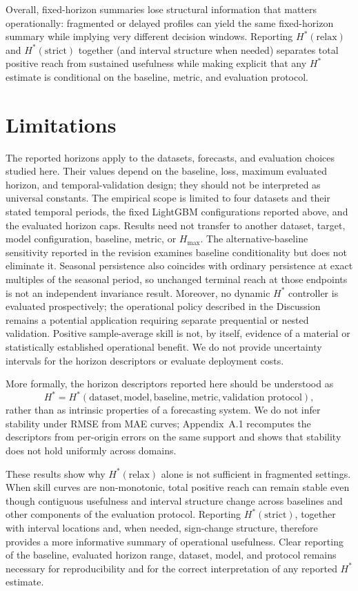 \documentclass[pdflatex]{sn-jnl}
\begin{document}
Overall, fixed-horizon summaries lose structural information that matters operationally: fragmented or delayed profiles can yield the same fixed-horizon summary while implying very different decision windows. Reporting $H^*(\mathrm{relax})$ and $H^*(\mathrm{strict})$ together (and interval structure when needed) separates total positive reach from sustained usefulness while making explicit that any $H^*$ estimate is conditional on the baseline, metric, and evaluation protocol.

\section{Limitations}

The reported horizons apply to the datasets, forecasts, and evaluation
choices studied here. Their values depend on the baseline, loss,
maximum evaluated horizon, and temporal-validation design; they should
not be interpreted as universal constants.
The empirical scope is limited to four datasets and their stated temporal
periods, the fixed LightGBM configurations reported above, and the evaluated
horizon caps. Results need not transfer to another dataset, target, model
configuration, baseline, metric, or $H_{\max}$. The alternative-baseline
sensitivity reported in the revision examines baseline conditionality but
does not eliminate it. Seasonal persistence also coincides with ordinary
persistence at exact multiples of the seasonal period, so unchanged terminal
reach at those endpoints is not an independent invariance result. Moreover, no dynamic $H^*$ controller is evaluated
prospectively; the operational policy described in the Discussion remains a
potential application requiring separate prequential or nested validation.
Positive sample-average skill is not, by itself, evidence of a material or
statistically established operational benefit. We do not provide uncertainty
intervals for the horizon descriptors or evaluate deployment costs.

More formally, the horizon descriptors reported here should be understood as
\[
H^* = H^*(\text{dataset}, \text{model}, \text{baseline}, \text{metric}, \text{validation protocol}),
\]
rather than as intrinsic properties of a forecasting system. We do not
infer stability under RMSE from MAE curves; Appendix~A.1 recomputes the
descriptors from per-origin errors on the same support and shows that
stability does not hold uniformly across domains.

These results show why $H^*(\mathrm{relax})$ alone is not sufficient in
fragmented settings. When skill curves are non-monotonic, total positive
reach can remain stable even though contiguous usefulness and interval
structure change across baselines and other components of the evaluation protocol. Reporting $H^*(\mathrm{strict})$,
together with interval locations and, when needed, sign-change
structure, therefore provides a more informative summary of operational
usefulness. Clear reporting of the baseline, evaluated horizon range,
dataset, model, and protocol remains necessary for reproducibility and
for the correct interpretation of any reported $H^*$ estimate.
\end{document}

